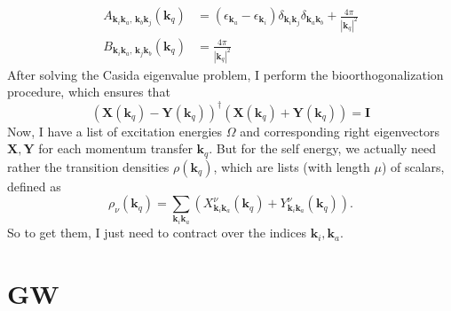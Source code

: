 \begin{align}
    A_{\bm{k}_i \bm{k}_a,\, \bm{k}_b \bm{k}_j }(\bm{k}_q) &= \left(\epsilon_{\bm{k}_a}-\epsilon_{\bm{k}_i}\right) \delta_{\bm{k}_i \bm{k}_j} \delta_{\bm{k}_a \bm{k}_b} + \frac{4\pi}{|\bm{k}_q|^2} \\
    B_{\bm{k}_i \bm{k}_a,\, \bm{k}_j \bm{k}_b}(\bm{k}_q) &= \frac{4\pi}{|\bm{k}_q|^2}
\end{align}
After solving the Casida eigenvalue problem, I perform the bioorthogonalization procedure, which ensures that
\begin{equation}
    \left(\bm{X}(\bm{k}_q) - \bm{Y}(\bm{k}_q)\right)^\dagger \left(\bm{X}(\bm{k}_q) + \bm{Y}(\bm{k}_q)\right) = \bm{I}
\end{equation}
Now, I have a list of excitation energies $\Omega$ and corresponding right eigenvectors $\bm{X}, \bm{Y}$ for each momentum transfer $\bm{k}_q$. But for the self energy, we actually need rather the transition densities $\rho(\bm{k}_q)$, which are lists (with length $\mu$) of scalars, defined as
\begin{equation}
    \rho_{\nu}(\bm{k}_q) = \sum_{\bm{k}_i \bm{k}_a} \left(X_{\bm{k}_i \bm{k}_a}^\nu(\bm{k}_q) + Y_{\bm{k}_i \bm{k}_a}^\nu(\bm{k}_q)\right).
\end{equation}
So to get them, I just need to contract over the indices $\bm{k}_i, \bm{k}_a$.
\section{GW}


